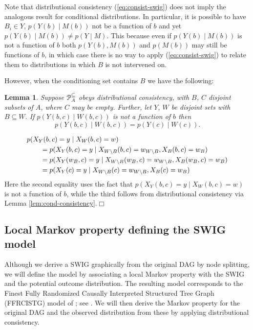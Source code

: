 \documentclass[11pt]{article}
\newtheorem{lemma}[theorem]{Lemma}
\begin{document}
Note that distributional consistency (\ref{eq:consist-swig}) does not imply the analogous result for conditional distributions. In particular, it is possible to have 
$B_i \in Y$,
$p(Y(b) \mid M(b))$ not be a function of $b$ and yet $p(Y(b) \mid M(b))\neq p(Y \mid M)$. This because even if $p(Y(b) \mid M(b))$ is not a function of $b$ both $p(Y(b),M(b))$ and $p(M(b))$ may still be functions of $b$, in which case there is no way to apply (\ref{eq:consist-swig}) to relate them to distributions in which $B$ is not intervened on.


However, when the conditioning set contains $B$ we have the following:



\begin{lemma}\label{lem:remove-b-from-conditional-not-a-fn}
Suppose ${\cal P}^{\tiny \subseteq}_A$ obeys distributional consistency, with $B$, $C$ disjoint subsets of $A$, where $C$ may be empty.  Further, let $Y$, $W$ be disjoint sets with $B\subseteq W$.
If $p(Y({ b},{ c})\mid W(b,c))$ is not a function of 
${ b}$ then
\begin{equation}\label{eq:remove-b-from-conditional}
p(Y({ b},{ c})\mid W(b,c)) = p(Y({ c})\mid W(c)).
\end{equation}
\end{lemma}

\begin{align*}
\MoveEqLeft{p(X_{Y}(b,c)=y \mid X_{W}(b,c)=w)}\\
 &= p(X_{Y}(b,c)=y \mid X_{W\setminus B}(b,c)=w_{W\setminus B}, X_{B}(b,c)=w_{B} ) \\
  &= p(X_{Y}(w_{B},c)=y \mid X_{W\setminus B}(w_{B},c)=w_{W\setminus B}, X_{B}(w_{B},c)=w_{B} ) \\
   &= p(X_{Y}(c)=y \mid X_{W\setminus B}(c)=w_{W\setminus B}, X_{B}(c)=w_{B} )
\end{align*}
Here the second equality uses the fact that  $p(X_{Y}(b,c)=y \mid X_{W}(b,c)=w)$ is not a function of $b$, while the 
third follows from distributional consistency  
via Lemma \ref{lem:cond-consistency}.\hfill$\Box$


\subsection{Local Markov property defining the SWIG model}

Although we derive a SWIG graphically from the original DAG by node splitting, we will define the model by associating a local Markov property with the SWIG and the potential outcome distribution. The resulting model corresponds to the Finest Fully Randomized Causally Interpreted Structured Tree Graph (FFRCISTG) model of \citet{robins86new}; see  \citep[Appendix C]{thomas13swig}.
We will then derive the Markov property for the original DAG and the observed distribution from these by applying distributional consistency.
\end{document}
